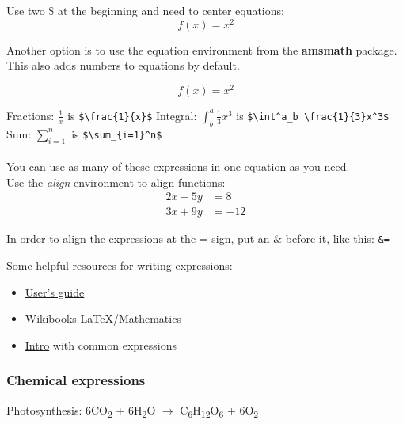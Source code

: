 \documentclass{article}
\begin{document}
Use two \$ at the beginning and need to center equations:
$$f(x) = x^2$$

Another option is to use the equation environment from the \textbf{amsmath} package.
This also adds numbers to equations by default.

\begin{equation}
    f(x) = x^2
\end{equation}  

\newpage

Fractions: $\frac{1}{x}$ is \verb|$\frac{1}{x}$|
\vspace{2mm}
\newline
\noindent Integral: $\int^a_b \frac{1}{3}x^3$ is \verb|$\int^a_b \frac{1}{3}x^3$|
\vspace{2mm}
\newline 
\noindent Sum: $\sum_{i=1}^n$ is \verb|$\sum_{i=1}^n$|\\~\\
You can use as many of these expressions in one equation as you need.\\

Use the \textit{align}-environment to align functions:\\
\begin{align*} 
2x - 5y &=  8 \\ 
3x + 9y &=  -12
\end{align*}

In order to align the expressions at the = sign, put an \& before it, like this: \verb|&=|

Some helpful resources for writing expressions:
\begin{itemize}
    \item \href{https://mirror.foobar.to/CTAN/macros/latex/required/amsmath/amsldoc.pdf}{User's guide}
    \item \href{https://en.wikibooks.org/wiki/LaTeX/Mathematics}{Wikibooks LaTeX/Mathematics} 
    \item \href{https://latex-tutorial.com/tutorials/amsmath/}{Intro} with common expressions
\end{itemize}
\vspace{2mm}
\subsubsection{Chemical expressions}
Photosynthesis: 6CO\textsubscript{2} + 6H\textsubscript{2}O $\rightarrow$ C\textsubscript{6}H\textsubscript{12}O\textsubscript{6} + 6O\textsubscript{2}
\end{document}
